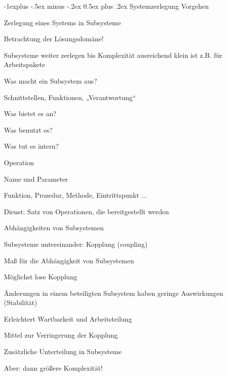 \documentclass[a4paper]{article}
\makeatletter
\renewcommand{\subsection}{\@startsection{subsection}{2}{0mm}%
                                {-1explus -.5ex minus -.2ex}%
                                {0.5ex plus .2ex}%
                                {\normalfont\normalsize\bfseries}}
\makeatother
\begin{document}
\begin{multicols}{3}
  \subsection{Systemzerlegung}
  Vorgehen
  \begin{itemize*}
    \item Zerlegung eines Systems in Subsysteme
    \item Betrachtung der Lösungsdomäne!
    \item Subsysteme weiter zerlegen bis Komplexität ausreichend klein ist z.B. für Arbeitspakete
  \end{itemize*}

  Was macht ein Subsystem aus?
  \begin{itemize*}
    \item Schnittstellen, Funktionen, „Verantwortung“
    \item Was bietet es an?
    \item Was benutzt es?
    \item Was tut es intern?
  \end{itemize*}

  Operation
  \begin{itemize*}
    \item Name und Parameter
    \item Funktion, Prozedur, Methode, Eintrittspunkt ...
  \end{itemize*}

  Dienst: Satz von Operationen, die bereitgestellt werden

  Abhängigkeiten von Subsystemen
  \begin{itemize*}
    \item Subsysteme untereinander: Kopplung (coupling)
    \item Maß für die Abhängigkeit von Subsystemen
  \end{itemize*}

  Möglichst lose Kopplung
  \begin{itemize*}
    \item Änderungen in einem beteiligten Subsystem haben geringe Auswirkungen (Stabilität)
    \item Erleichtert Wartbarkeit und Arbeitsteilung
  \end{itemize*}

  Mittel zur Verringerung der Kopplung
  \begin{itemize*}
    \item Zusätzliche Unterteilung in Subsysteme
    \item Aber: dann größere Komplexität!
  \end{itemize*}


\end{multicols}
\end{document}
